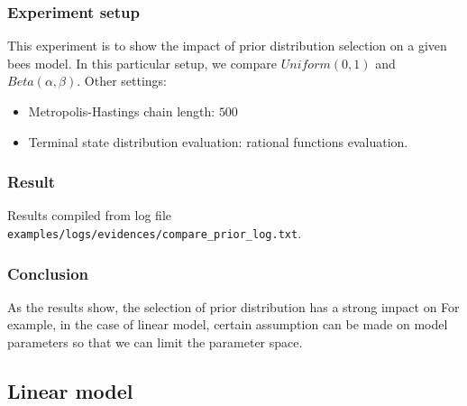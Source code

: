 \documentclass[12pt]{article}
\theoremstyle{definition}
\begin{document}
\subsubsection{Experiment setup}
This experiment is to show the impact of prior distribution selection on a given
bees model. In this particular setup, we compare $Uniform(0,1)$ and
$Beta(\alpha, \beta)$. Other settings: 
\begin{itemize}
\item Metropolis-Hastings chain length: $500$
\item Terminal state distribution evaluation: rational functions evaluation.
\end{itemize}

\subsubsection{Result}

Results compiled from log file \texttt{examples/logs/evidences/compare\_prior\_log.txt}.\\

\subsubsection{Conclusion}
As the results show, the selection of prior distribution has a strong impact on 
For example, in the case of linear model, certain assumption can be made on
model parameters so that we can limit the parameter space. 


\subsection{Linear model}
\end{document}
